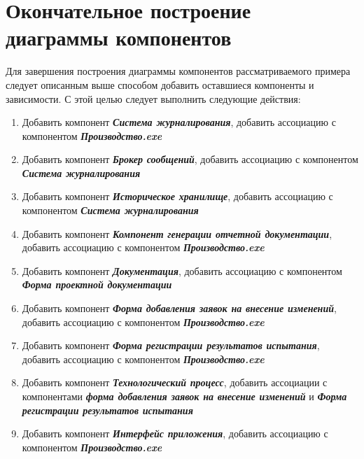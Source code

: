 \documentclass[a4paper,12pt]{extreport}
\begin{document}
\section*{Окончательное построение диаграммы компонентов }
Для завершения построения диаграммы компонентов рассматриваемого примера следует описанным выше способом добавить оставшиеся компоненты и зависимости. С этой целью следует выполнить следующие действия:
\begin{enumerate}
	\item Добавить компонент \textit{\textbf{Система журналирования}}, добавить ассоциацию с компонентом \textit{\textbf{Производство.exe}}
	
	\item Добавить компонент \textit{\textbf{Брокер сообщений}}, добавить ассоциацию с компонентом \textit{\textbf{Система журналирования}}
	
	\item Добавить компонент \textit{\textbf{Историческое хранилище}}, добавить ассоциацию с компонентом \textit{\textbf{Система журналирования}}
	
	\item Добавить компонент \textit{\textbf{Компонент генерации отчетной документации}}, добавить ассоциацию с компонентом \textit{\textbf{Производство.exe}}
	
	\item Добавить компонент \textit{\textbf{Документация}}, добавить ассоциацию с компонентом \textit{\textbf{Форма проектной документации}}
	
	\item Добавить компонент \textit{\textbf{Форма добавления заявок на внесение изменений}}, добавить ассоциацию с компонентом \textit{\textbf{Производство.exe}}
	
	\item Добавить компонент \textit{\textbf{Форма регистрации результатов испытания}}, добавить ассоциацию с компонентом \textit{\textbf{Производство.exe}}
	
	\item Добавить компонент \textit{\textbf{Технологический процесс}}, добавить ассоциации с компонентами \textit{\textbf{форма добавления заявок на внесение изменений}} и \textit{\textbf{Форма регистрации результатов испытания}}
	
	\item Добавить компонент \textit{\textbf{Интерфейс приложения}}, добавить ассоциацию с компонентом \textit{\textbf{Производство.exe}}
\end{enumerate}
\end{document}
